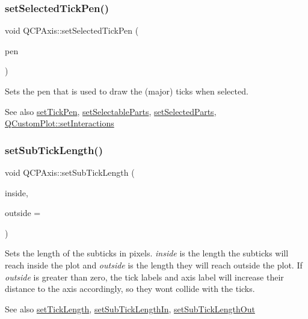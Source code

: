 \subsubsection{\texorpdfstring{set\+Selected\+Tick\+Pen()}{setSelectedTickPen()}}
{\footnotesize\ttfamily void Q\+C\+P\+Axis\+::set\+Selected\+Tick\+Pen (\begin{DoxyParamCaption}\item[{const Q\+Pen \&}]{pen }\end{DoxyParamCaption})}

Sets the pen that is used to draw the (major) ticks when selected.

\begin{DoxySeeAlso}{See also}
\hyperlink{class_q_c_p_axis_ad80923bcc1c5da4c4db602c5325e797e}{set\+Tick\+Pen}, \hyperlink{class_q_c_p_axis_a513f9b9e326c505d9bec54880031b085}{set\+Selectable\+Parts}, \hyperlink{class_q_c_p_axis_ab9d7a69277dcbed9119b3c1f25ca19c3}{set\+Selected\+Parts}, \hyperlink{class_q_custom_plot_a5ee1e2f6ae27419deca53e75907c27e5}{Q\+Custom\+Plot\+::set\+Interactions} 
\end{DoxySeeAlso}
\mbox{\label{class_q_c_p_axis_ab702d6fd42fc620607435339a1c2a2e1}} 
\subsubsection{\texorpdfstring{set\+Sub\+Tick\+Length()}{setSubTickLength()}}
{\footnotesize\ttfamily void Q\+C\+P\+Axis\+::set\+Sub\+Tick\+Length (\begin{DoxyParamCaption}\item[{int}]{inside,  }\item[{int}]{outside = {} }\end{DoxyParamCaption})}

Sets the length of the subticks in pixels. {\itshape inside} is the length the subticks will reach inside the plot and {\itshape outside} is the length they will reach outside the plot. If {\itshape outside} is greater than zero, the tick labels and axis label will increase their distance to the axis accordingly, so they won\textquotesingle{}t collide with the ticks.

\begin{DoxySeeAlso}{See also}
\hyperlink{class_q_c_p_axis_a62ec40bebe3540e9c1479a8fd2be3b0d}{set\+Tick\+Length}, \hyperlink{class_q_c_p_axis_ac46fa2a993a9f5789540977610acf1de}{set\+Sub\+Tick\+Length\+In}, \hyperlink{class_q_c_p_axis_a4c6dfc3963492ed72a77724012df5f23}{set\+Sub\+Tick\+Length\+Out} 
\end{DoxySeeAlso}
\mbox{\label{class_q_c_p_axis_ac46fa2a993a9f5789540977610acf1de}} 
